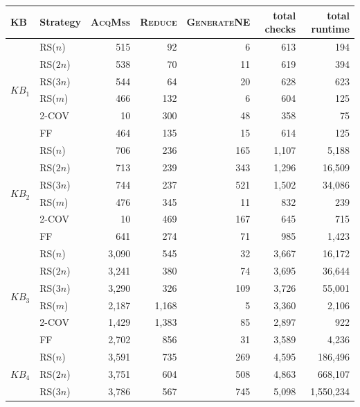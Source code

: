 %
\begin{tabular}{llrrrrr}
\toprule
KB & Strategy & \textsc{AcqMss} & \textsc{Reduce} & \textsc{GenerateNE} & total checks & total runtime \\
\midrule
\multirow{6}{*}{$KB_1$} & RS($n$) & 515 & 92 & 6 & 613 & 194 \\
 & RS($2n$) & 538 & 70 & 11 & 619 & 394 \\
 & RS($3n$) & 544 & 64 & 20 & 628 & 623 \\
 & RS($m$) & 466 & 132 & 6 & 604 & 125 \\
 & 2-COV & 10 & 300 & 48 & 358 & 75 \\
 & FF & 464 & 135 & 15 & 614 & 125 \\
\midrule
\multirow{6}{*}{$KB_2$} & RS($n$) & 706 & 236 & 165 & 1{,}107 & 5{,}188 \\
 & RS($2n$) & 713 & 239 & 343 & 1{,}296 & 16{,}509 \\
 & RS($3n$) & 744 & 237 & 521 & 1{,}502 & 34{,}086 \\
 & RS($m$) & 476 & 345 & 11 & 832 & 239 \\
 & 2-COV & 10 & 469 & 167 & 645 & 715 \\
 & FF & 641 & 274 & 71 & 985 & 1{,}423 \\
\midrule
\multirow{6}{*}{$KB_3$} & RS($n$) & 3{,}090 & 545 & 32 & 3{,}667 & 16{,}172 \\
 & RS($2n$) & 3{,}241 & 380 & 74 & 3{,}695 & 36{,}644 \\
 & RS($3n$) & 3{,}290 & 326 & 109 & 3{,}726 & 55{,}001 \\
 & RS($m$) & 2{,}187 & 1{,}168 & 5 & 3{,}360 & 2{,}106 \\
 & 2-COV & 1{,}429 & 1{,}383 & 85 & 2{,}897 & 922 \\
 & FF & 2{,}702 & 856 & 31 & 3{,}589 & 4{,}236 \\
\midrule
\multirow{6}{*}{$KB_4$} & RS($n$) & 3{,}591 & 735 & 269 & 4{,}595 & 186{,}496 \\
 & RS($2n$) & 3{,}751 & 604 & 508 & 4{,}863 & 668{,}107 \\
 & RS($3n$) & 3{,}786 & 567 & 745 & 5{,}098 & 1{,}550{,}234 \\

\end{tabular}
